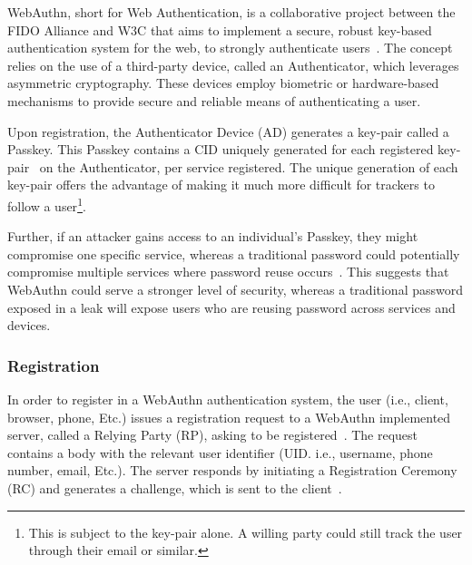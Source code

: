 
\newcommand{\credIdentifier}{\footnote{There is a requirement to check whether the credential identifier, generated by the Authenticator
device exsits on the server.
For further discussions on this topic, see section \hyperref[sec:futurework]{Future work}}}

\newcommand{\navigatorApi}{\footnote{In LessPM's case, this is the \textit{navigator.credentials} API provided by the browser.}}


WebAuthn, short for Web Authentication, is a collaborative project between the
FIDO Alliance and W3C that aims to implement a secure, robust key-based
authentication system for the web, to strongly authenticate users~\cite{webauthn_level_2}.
The concept relies on the use of a third-party device, called an Authenticator,
which leverages asymmetric cryptography.
These devices employ biometric or hardware-based mechanisms to provide secure
and reliable means of authenticating a user.

Upon registration, the Authenticator Device (AD) generates a key-pair called a
Passkey.
This Passkey contains a CID uniquely generated for each registered
key-pair~\cite{webauthn_credential_id,webauthn_public_key_credential} on the
Authenticator, per service registered.
The unique generation of each key-pair offers the advantage of making it much
more difficult for trackers to follow a user\footnote{
  This is subject to the key-pair alone. A willing party could still track the
  user through their email or similar.
}.

Further, if an attacker gains access to an individual's Passkey, they might
compromise one specific service, whereas a traditional password could
potentially compromise multiple services where password reuse
occurs~\cite{wang2018next}.
This suggests that WebAuthn could serve a stronger level of security, whereas
a traditional password exposed in a leak will expose users who are reusing
password across services and devices.

\subsubsection{Registration}\label{subsubsec:registration}
In order to register in a WebAuthn authentication system, the user (i.e.,
client, browser, phone, Etc.) issues a registration request to a
WebAuthn implemented server, called a Relying Party (RP), asking to be
registered~\cite{webauthn-2-rp}.
The request contains a body with the relevant user identifier (UID. i.e.,
username, phone number, email, Etc.).
The server responds by initiating a Registration Ceremony (RC) and generates a
challenge, which is sent to the client~\cite{webauthn-2}.

